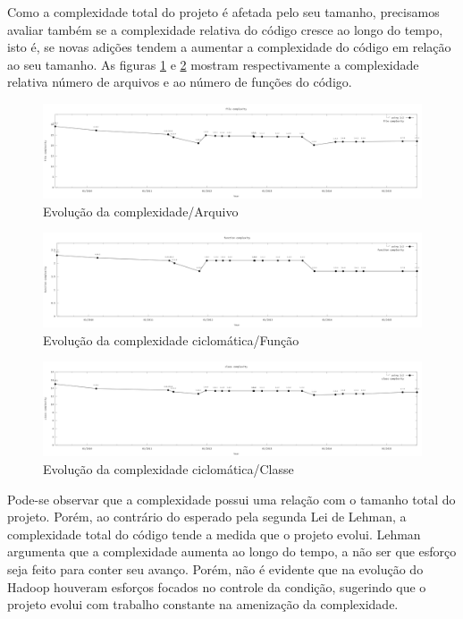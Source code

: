Como a complexidade total do projeto é afetada pelo seu tamanho, precisamos avaliar também se a complexidade relativa do código cresce ao longo do tempo, isto é, se novas adições tendem a aumentar a complexidade do código em relação ao seu tamanho. As figuras \ref{fig:file_complexity} e \ref{fig:functioncomplexity} mostram respectivamente a complexidade relativa número de arquivos e ao número de funções do código.
\begin{figure}[h]
	\centering
	\includegraphics[width=0.7\linewidth]{figure/file_complexity}
	\caption{Evolução da complexidade/Arquivo}
	\label{fig:file_complexity}
\end{figure}
\begin{figure}[h]
	\centering
	\includegraphics[width=0.7\linewidth]{figure/function_complexity}
	\caption{Evolução da complexidade ciclomática/Função}
	\label{fig:functioncomplexity}
\end{figure}
\begin{figure}[h]
	\centering
	\includegraphics[width=0.7\linewidth]{figure/class_complexity}
	\caption{Evolução da complexidade ciclomática/Classe}
	\label{fig:classcomplexity}
\end{figure}
Pode-se observar que a complexidade possui uma relação com o tamanho total do projeto. Porém, ao contrário do esperado pela segunda Lei de Lehman, a complexidade total do código tende a medida que o projeto evolui. Lehman argumenta que a complexidade aumenta ao longo do tempo, a não ser que esforço seja feito para conter seu avanço. Porém, não é evidente que na evolução do Hadoop houveram esforços focados no controle da condição, sugerindo que o projeto evolui com trabalho constante na amenização da complexidade.

